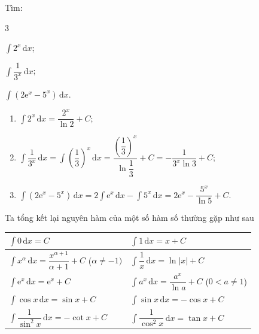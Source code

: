 \documentclass[12pt,aspectratio=169]{beamer}
\begin{document}
\begin{vd}
	Tìm:
	\begin{enumEX}{3}
		\item $\displaystyle\int 2^x\mathrm{\,d}x$;
		\item $\displaystyle\int \dfrac{1}{3^x}\mathrm{\,d}x$;
		\item $\displaystyle\int \left(2\mathrm{e}^x-5^x\right)\mathrm{\,d}x$.
	\end{enumEX}

	\begin{loigiai}
		\begin{enumerate}
			\item $\displaystyle\int 2^x\mathrm{\,d}x = \dfrac{2^x}{\ln 2} + C$;
			\item $\displaystyle\int \dfrac{1}{3^x}\mathrm{\,d}x = \displaystyle\int \left(\dfrac{1}{3}\right)^x\mathrm{\,d}x = \dfrac{\left(\dfrac{1}{3}\right)^x}{\ln\dfrac{1}{3}} + C = -\dfrac{1}{3^x \ln 3} + C$;
			\item $\displaystyle\int \left(2\mathrm{e}^x-5^x\right)\mathrm{\,d}x = 2 \displaystyle\int \mathrm{e}^x\mathrm{\,d}x - \displaystyle\int 5^x\mathrm{\,d}x = 2\mathrm{e}^x - \dfrac{5^x}{\ln 5} + C$.
		\end{enumerate}
	\end{loigiai}
\end{vd}

\begin{tomtat}
Ta tổng kết lại nguyên hàm của một số hàm số thường gặp như sau
\begin{center}
\renewcommand{\arraystretch}{1.5}
	\begin{tabular}{|l|l|} \hline
		$\displaystyle\int 0 \mathrm{\,d}x = C$& $\displaystyle\int 1\mathrm{\,d}x = x + C$\\ \hline
		$\displaystyle\int x^\alpha\mathrm{\,d}x = \dfrac{x^{\alpha+1}}{\alpha + 1} + C$ ($\alpha\neq-1)$& $\displaystyle\int \dfrac{1}{x}\mathrm{\,d}x = \ln|x| + C$\\ \hline
		$\displaystyle\int \mathrm{e}^x\mathrm{\,d}x = \mathrm{e}^x + C$& $\displaystyle\int a^x\mathrm{\,d}x = \dfrac{a^x}{\ln a} + C$ ($0<a\neq1$)\\ \hline
		$\displaystyle\int \cos x\mathrm{\,d}x = \sin x + C$& $\displaystyle\int \sin x\mathrm{\,d}x = -\cos x + C$\\ \hline
		$\displaystyle\int \dfrac{1}{\sin^2 x}\mathrm{\,d}x = -\cot x + C$& $\displaystyle\int \dfrac{1}{\cos^2 x}\mathrm{\,d}x = \tan x + C$\\ \hline
	\end{tabular}
\end{center}
\end{tomtat}
\end{document}
